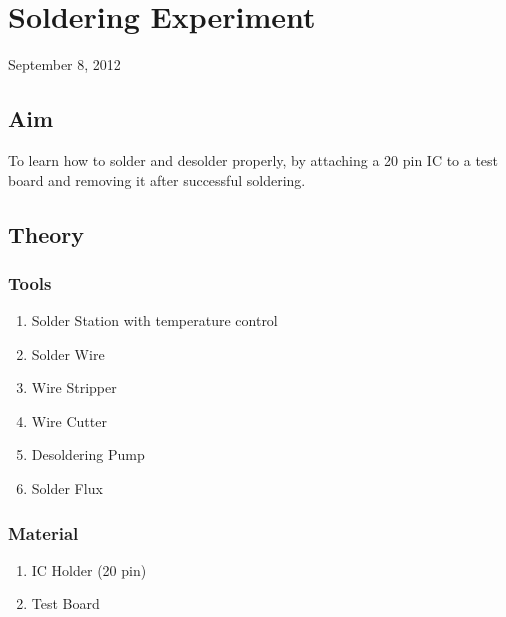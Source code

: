 \chapter{Soldering Experiment}
\begin{flushright}
September 8, 2012
\end{flushright}
\section{Aim}
To learn how to solder and desolder properly, by attaching a 20 pin IC to a test board and removing it after successful soldering.

\section{Theory}
	\subsection {Tools}
		\begin{enumerate}
			\item Solder Station with temperature control
			\item Solder Wire
			\item Wire Stripper
			\item Wire Cutter			
			\item Desoldering Pump
			\item Solder Flux
		\end{enumerate}
	\subsection {Material}
		\begin{enumerate}
			\item IC Holder (20 pin)
			\item Test Board
		\end{enumerate}
